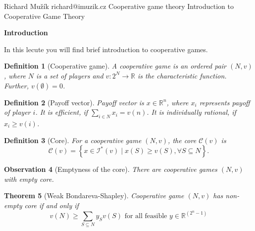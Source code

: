 \documentclass[12pt]{report}
\newcommand{\Talk}[4]{%
  \Id\FirstName #1 \Surname #2 \Email #3
  \Serie
  \Title #4
  \PaperAuthor
  \Link
  \Text\End
}
\newcommand{\PaperTalk}[6]{%
  \Id\FirstName #1 \Surname #2 \Email #3
  \Serie
  \Title #5
  \PaperAuthor #4
  \Link #6
  \Text\End
}
\newcommand{\SeriesTalk}[7]{%
  \Id\FirstName #1 \Surname #2 \Email #3
  \Serie #6
  \Title #5
  \PaperAuthor #4
  \Link #7
  \Text\End
}
\newcommand{\SeriesOther}[5]{%
  \Id\FirstName #1 \Surname #2 \Email #3
  \Serie #5
  \Title #4
  \PaperAuthor
  \Link
  \Text\End
}
\newcounter{theorem}
\newtheorem{definition}[theorem]{Definition}
\newtheorem{theorem}{Theorem}
\newtheorem{observation}[theorem]{Observation}
\def\section#1{\vskip 9pt plus 2pt minus 1pt\centerline{\bf #1}\par\ignorespaces}
\begin{document}
\SeriesOther{Richard}{Mužík}{richard@imuzik.cz}{Introduction to Cooperative Game Theory}{Cooperative game theory}
\section{Introduction}
In this lecute you will find brief introduction to cooperative games.

\begin{definition}[Cooperative game]
  A cooperative game is an ordered pair $(N,v)$, where $N$ is a set of players and $v\colon 2^N \to \mathbb{R}$ is the characteristic function. Further, $v(\emptyset) = 0$.
\end{definition}

\begin{definition}[Payoff vector]
  Payoff vector is $x \in \mathbb{R}^n$, where $x_i$ represents payoff of player $i$. It is efficient, if $\sum_{i \in N} x_i = v(n)$. It is individually rational, if $x_i \geq v(i)$.
\end{definition}

\begin{definition}[Core]
  For a cooperative game $(N,v)$, the core $\mathcal{C}(v)$ is
  \[
    \mathcal{C}(v) = \left\{x \in \mathcal{I}^*(v) \mid x(S) \geq v(S), \forall S \subseteq N \right\}.
  \]
\end{definition}

\begin{observation}[Emptyness of the core]
  There are cooperative games $(N,v)$ with empty core.
\end{observation}

\begin{theorem}[Weak Bondareva-Shapley]
  Cooperative game $\left(N,v\right)$ has non-empty core if and only if 
	\[
		v\left(N\right) \geq \sum_{S \subseteq N} y_S v\left(S\right)\text{ for all feasible }y \in \mathbb{R}^{\left(2^n-1\right)}
	\]
\end{theorem}
\end{document}
